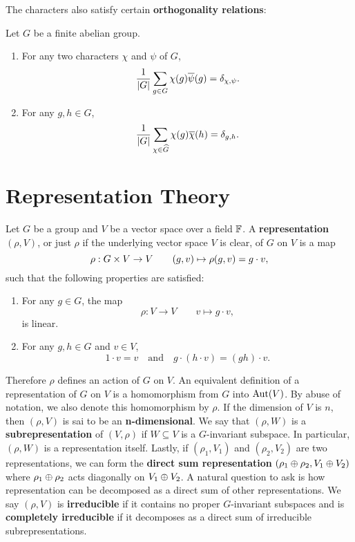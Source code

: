     The characters also satisfy certain \textbf{orthogonality relations}:

    \begin{proposition}
      Let $G$ be a finite abelian group.
      \begin{enumerate}[label=(\roman*)]
        \item For any two characters $\chi$ and $\psi$ of $G$,
        \[
          \frac{1}{|G|}\sum_{g \in G}\chi(g)\overline{\psi}(g) = \delta_{\chi,\psi}.
        \]
        \item For any $g,h \in G$,
        \[
          \frac{1}{|G|}\sum_{\chi \in \widehat{G}}\chi(g)\overline{\chi}(h) = \delta_{g,h}.
        \]
      \end{enumerate}
    \end{proposition}
  \section{Representation Theory}\label{append:Representation_Theory}
    Let $G$ be a group and $V$ be a vector space over a field $\mathbb{F}$. A \textbf{representation} $(\rho,V)$, or just $\rho$ if the underlying vector space $V$ is clear, of $G$ on $V$ is a map
    \[
      \rho:G \times V \to V \qquad (g,v) \mapsto \rho(g,v) = g \cdot v,
    \]
    such that the following properties are satisfied:
    \begin{enumerate}
      \item For any $g \in G$, the map
      \[
        \rho:V \to V \qquad v \mapsto g \cdot v,
      \]
      is linear.
      \item For any $g,h \in G$ and $v \in V$,
      \[
        1 \cdot v = v \quad \text{and} \quad g \cdot (h \cdot v) = (gh) \cdot v.
      \]
    \end{enumerate}
    Therefore $\rho$ defines an action of $G$ on $V$. An equivalent definition of a representation of $G$ on $V$ is a homomorphism from $G$ into $\operatorname{\mathrm{Aut}}(V)$. By abuse of notation, we also denote this homomorphism by $\rho$. If the dimension of $V$ is $n$, then $(\rho,V)$ is sai to be an \textbf{n-dimensional}. We say that $(\rho,W)$ is a \textbf{subrepresentation} of $(V,\rho)$ if $W \subseteq V$ is a $G$-invariant subspace. In particular, $(\rho,W)$ is a representation itself. Lastly, if $(\rho_{1},V_{1})$ and $(\rho_{2},V_{2})$ are two representations, we can form the \textbf{direct sum representation} $(\rho_{1} \oplus \rho_{2},V_{1} \oplus V_{2})$ where $\rho_{1} \oplus \rho_{2}$ acts diagonally on $V_{1} \oplus V_{2}$. A natural question to ask is how representation can be decomposed as a direct sum of other representations. We say $(\rho,V)$ is \textbf{irreducible} if it contains no proper $G$-invariant subspaces and is \textbf{completely irreducible} if it decomposes as a direct sum of irreducible subrepresentations.

